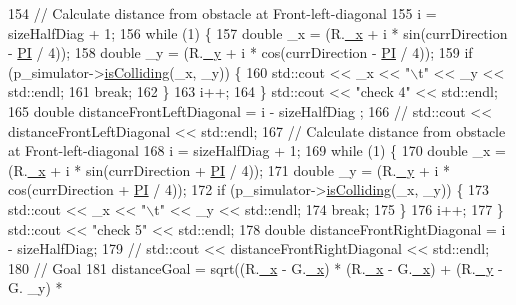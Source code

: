 \begin{DoxyCode}
154   \textcolor{comment}{//  Calculate distance from obstacle at Front-left-diagonal}
155   i = sizeHalfDiag  + 1;
156   \textcolor{keywordflow}{while} (1) \{
157     \textcolor{keywordtype}{double} \_x = (R.\hyperlink{structPoint_a77b9bd094b57efb7c185fdb3fb781900}{\_x} + i * sin(currDirection - \hyperlink{Actor_8hpp_a598a3330b3c21701223ee0ca14316eca}{PI} / 4));
158     \textcolor{keywordtype}{double} \_y = (R.\hyperlink{structPoint_aa8be383c30dee092979999b523373658}{\_y} + i * cos(currDirection - \hyperlink{Actor_8hpp_a598a3330b3c21701223ee0ca14316eca}{PI} / 4));
159     \textcolor{keywordflow}{if} (p\_simulator->\hyperlink{classRobotSimulator_a564d79ead199c034841eda1b3ebebfcd}{isColliding}(\_x, \_y)) \{
160       std::cout << \_x << \textcolor{stringliteral}{"\(\backslash\)t"} << \_y << std::endl;
161       \textcolor{keywordflow}{break};
162     \}
163     i++;
164   \} std::cout << \textcolor{stringliteral}{"check 4"} << std::endl;
165   \textcolor{keywordtype}{double} distanceFrontLeftDiagonal = i - sizeHalfDiag ;
166   \textcolor{comment}{//  std::cout << distanceFrontLeftDiagonal << std::endl;}
167   \textcolor{comment}{//  Calculate distance from obstacle at Front-left-diagonal}
168   i = sizeHalfDiag + 1;
169   \textcolor{keywordflow}{while} (1) \{
170     \textcolor{keywordtype}{double} \_x = (R.\hyperlink{structPoint_a77b9bd094b57efb7c185fdb3fb781900}{\_x} + i * sin(currDirection + \hyperlink{Actor_8hpp_a598a3330b3c21701223ee0ca14316eca}{PI} / 4));
171     \textcolor{keywordtype}{double} \_y = (R.\hyperlink{structPoint_aa8be383c30dee092979999b523373658}{\_y} + i * cos(currDirection + \hyperlink{Actor_8hpp_a598a3330b3c21701223ee0ca14316eca}{PI} / 4));
172     \textcolor{keywordflow}{if} (p\_simulator->\hyperlink{classRobotSimulator_a564d79ead199c034841eda1b3ebebfcd}{isColliding}(\_x, \_y)) \{
173       std::cout << \_x << \textcolor{stringliteral}{"\(\backslash\)t"} << \_y << std::endl;
174       \textcolor{keywordflow}{break};
175     \}
176     i++;
177   \} std::cout << \textcolor{stringliteral}{"check 5"} << std::endl;
178   \textcolor{keywordtype}{double} distanceFrontRightDiagonal = i -  sizeHalfDiag;
179   \textcolor{comment}{//  std::cout << distanceFrontRightDiagonal << std::endl;}
180   \textcolor{comment}{//  Goal}
181   distanceGoal = sqrt((R.\hyperlink{structPoint_a77b9bd094b57efb7c185fdb3fb781900}{\_x} - G.\hyperlink{structPoint_a77b9bd094b57efb7c185fdb3fb781900}{\_x}) * (R.\hyperlink{structPoint_a77b9bd094b57efb7c185fdb3fb781900}{\_x} - G.\hyperlink{structPoint_a77b9bd094b57efb7c185fdb3fb781900}{\_x}) + (R.\hyperlink{structPoint_aa8be383c30dee092979999b523373658}{\_y} - G. \_y) *

\end{DoxyCode}
